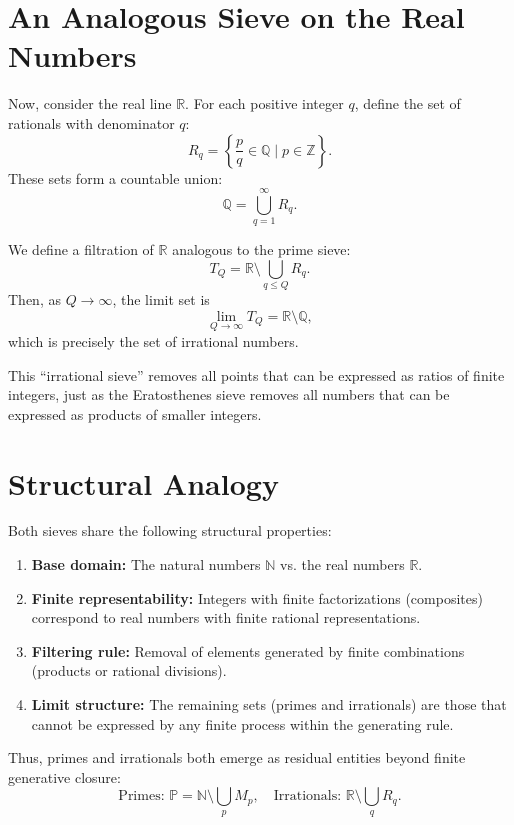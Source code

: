 \documentclass[11pt]{article}
\begin{document}
\section{An Analogous Sieve on the Real Numbers}

Now, consider the real line $\mathbb{R}$. 
For each positive integer $q$, define the set of rationals with denominator $q$:
\[
R_q = \left\{ \frac{p}{q} \in \mathbb{Q} \mid p \in \mathbb{Z} \right\}.
\]
These sets form a countable union:
\[
\mathbb{Q} = \bigcup_{q=1}^{\infty} R_q.
\]

We define a filtration of $\mathbb{R}$ analogous to the prime sieve:
\[
T_Q = \mathbb{R} \setminus \bigcup_{q \le Q} R_q.
\]
Then, as $Q \to \infty$, the limit set is
\[
\lim_{Q \to \infty} T_Q = \mathbb{R} \setminus \mathbb{Q},
\]
which is precisely the set of irrational numbers.

This ``irrational sieve'' removes all points that can be expressed as ratios 
of finite integers, just as the Eratosthenes sieve removes all numbers 
that can be expressed as products of smaller integers.

\section{Structural Analogy}

Both sieves share the following structural properties:
\begin{enumerate}
    \item \textbf{Base domain:} The natural numbers $\mathbb{N}$ vs. 
          the real numbers $\mathbb{R}$.
    \item \textbf{Finite representability:} 
          Integers with finite factorizations (composites) correspond 
          to real numbers with finite rational representations.
    \item \textbf{Filtering rule:} 
          Removal of elements generated by finite combinations 
          (products or rational divisions).
    \item \textbf{Limit structure:} 
          The remaining sets (primes and irrationals) 
          are those that cannot be expressed by any finite process 
          within the generating rule.
\end{enumerate}

Thus, primes and irrationals both emerge as residual entities 
beyond finite generative closure:
\[
\text{Primes: } \mathbb{P} = \mathbb{N} \setminus 
\bigcup_{p} M_p,
\quad
\text{Irrationals: } \mathbb{R} \setminus \bigcup_{q} R_q.
\]
\end{document}
